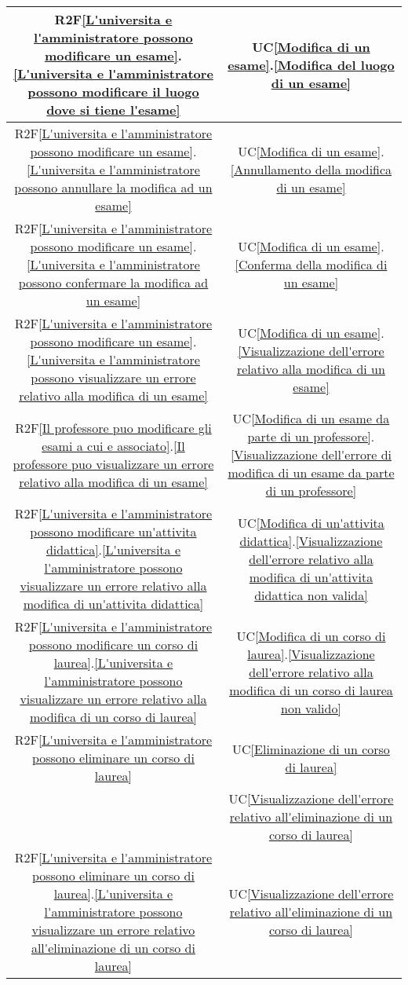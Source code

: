 \begin{longtable}{|c|c|}
\hline
R2F\ref{L'universita e l'amministratore possono modificare un esame}.\ref{L'universita e l'amministratore possono modificare il luogo dove si tiene l'esame} & UC\ref{Modifica di un esame}.\ref{Modifica del luogo di un esame}\\
\hline
R2F\ref{L'universita e l'amministratore possono modificare un esame}.\ref{L'universita e l'amministratore possono annullare la modifica ad un esame} & UC\ref{Modifica di un esame}.\ref{Annullamento della modifica di un esame}\\
\hline
R2F\ref{L'universita e l'amministratore possono modificare un esame}.\ref{L'universita e l'amministratore possono confermare la modifica ad un esame} & UC\ref{Modifica di un esame}.\ref{Conferma della modifica di un esame}\\
\hline
R2F\ref{L'universita e l'amministratore possono modificare un esame}.\ref{L'universita e l'amministratore possono visualizzare un errore relativo alla modifica di un esame} & UC\ref{Modifica di un esame}.\ref{Visualizzazione dell'errore relativo alla modifica di un esame}\\
\hline
R2F\ref{Il professore puo modificare gli esami a cui e associato}.\ref{Il professore puo visualizzare un errore relativo alla modifica di un esame} &  UC\ref{Modifica di un esame da parte di un professore}.\ref{Visualizzazione dell'errore di modifica di un esame da parte di un professore}\\
\hline
R2F\ref{L'universita e l'amministratore possono modificare un'attivita didattica}.\ref{L'universita e l'amministratore possono visualizzare un errore relativo alla modifica di un'attivita didattica} & UC\ref{Modifica di un'attivita didattica}.\ref{Visualizzazione dell'errore relativo alla modifica di un'attivita didattica non valida}\\
\hline
R2F\ref{L'universita e l'amministratore possono modificare un corso di laurea}.\ref{L'universita e l'amministratore possono visualizzare un errore relativo alla modifica di un corso di laurea} & UC\ref{Modifica di un corso di laurea}.\ref{Visualizzazione dell'errore relativo alla modifica di un corso di laurea non valido}\\
\hline
R2F\ref{L'universita e l'amministratore possono eliminare un corso di laurea} & UC\ref{Eliminazione di un corso di laurea}\\
& UC\ref{Visualizzazione dell'errore relativo all'eliminazione di un corso di laurea}\\
\hline
R2F\ref{L'universita e l'amministratore possono eliminare un corso di laurea}.\ref{L'universita e l'amministratore possono visualizzare un errore relativo all'eliminazione di un corso di laurea} & UC\ref{Visualizzazione dell'errore relativo all'eliminazione di un corso di laurea}\\

\end{longtable}
